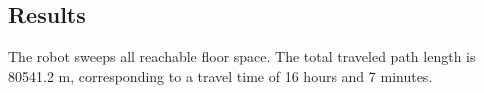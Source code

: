 \subsection{Results}
The robot sweeps all reachable floor space.
The total traveled path length is 80541.2 m, corresponding to a travel time of 16 hours and 7 minutes.